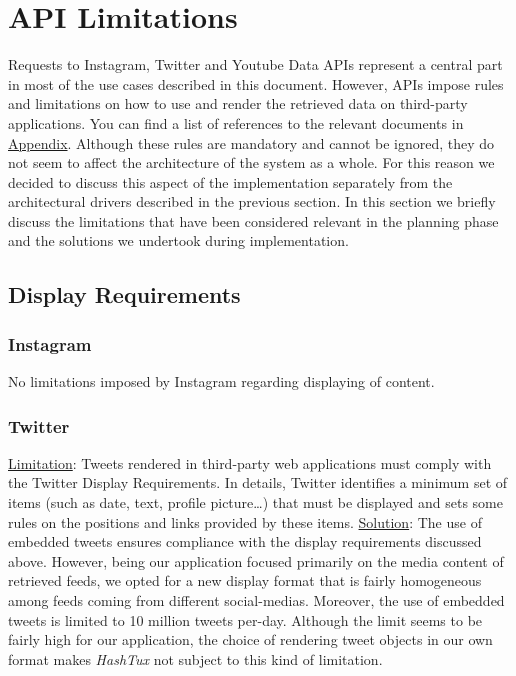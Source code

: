 \hypertarget{apilimits}{
\section{API Limitations}}
Requests to Instagram, Twitter and Youtube Data APIs represent a central part in
most of the use cases described in this document. However, APIs impose rules and
limitations on how to use and render the retrieved data on third-party
applications. You can find a list of references to the relevant documents in
\hyperlink{refapis}{Appendix}. \newline
Although these rules are mandatory and cannot be ignored, they do not seem to
affect the architecture of the system as a whole. For this reason we decided to
discuss this aspect of the implementation separately from the architectural
drivers described in the previous section. In this section we briefly discuss
the limitations that have been considered relevant in the planning phase and the
solutions we undertook during implementation.

\subsection{Display Requirements}
\subsubsection{Instagram}
No limitations imposed by Instagram regarding displaying of content.
\subsubsection{Twitter}
\underline{Limitation}: Tweets rendered in third-party web applications must
comply with the Twitter Display Requirements. In details, Twitter identifies a
minimum set of items (such as date, text, profile picture\dots) that must be
displayed and sets some rules on the positions and links provided by these
items. \newline
\underline{Solution}: The use of embedded tweets ensures compliance with the
display requirements discussed above. However, being our application focused
primarily on the media content of retrieved feeds, we opted for a new display
format that is fairly homogeneous among feeds coming from different
social-medias. Moreover, the use of embedded tweets is limited to 10 million
tweets per-day. Although the limit seems to be fairly high for our application,
the choice of rendering tweet objects in our own format makes \textit{HashTux}
not subject to this kind of limitation.
